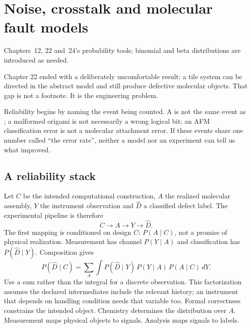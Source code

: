 \chapter{Noise, crosstalk and molecular fault models}
{Chapters~12, 22 and~24's probability tools; binomial and beta distributions are introduced as needed.}

Chapter 22 ended with a deliberately uncomfortable result: a tile system can be
directed in the abstract model and still produce defective molecular objects. That
gap is not a footnote. It is the engineering problem.

Reliability begins by naming the event being counted. A  is not
the same event as ; a malformed origami is not necessarily
a wrong logical bit; an AFM classification error is not a molecular attachment
error. If these events share one number called ``the error rate'', neither a model
nor an experiment can tell us what improved.

\section{A reliability stack}

Let $C$ be the intended computational construction, $A$ the realized molecular
assembly, $Y$ the instrument observation and $\hat D$ a classified defect label.
The experimental pipeline is therefore
\[
 C \longrightarrow A \longrightarrow Y \longrightarrow \hat D.
\]
The first mapping is conditioned on design $C$: $P(A\mid C)$, not a promise of
physical realization. Measurement has channel $P(Y\mid A)$ and classification
has $P(\hat D\mid Y)$. Composition gives
\[
P(\hat D\mid C)=\sum_A\int P(\hat D\mid Y)\,P(Y\mid A)\,P(A\mid C)\,dY.
\]
Use a sum rather than the integral for a discrete observation. This factorization
assumes the declared intermediates include the relevant history; an instrument that
depends on handling condition needs that variable too. Formal correctness constrains
the intended object. Chemistry determines the distribution over $A$. Measurement maps
physical objects to signals. Analysis maps signals to labels.


